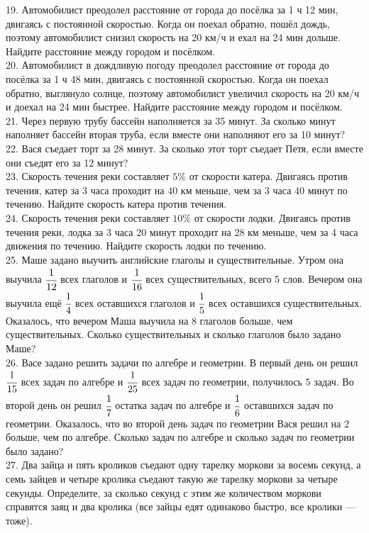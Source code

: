 \documentclass[12pt]{article}
\begin{document}
19. Автомобилист преодолел расстояние от города до посёлка за 1 ч 12 мин, двигаясь с постоянной скоростью. Когда он поехал обратно, пошёл дождь, поэтому автомобилист снизил скорость на 20 км/ч и ехал на 24 мин дольше. Найдите расстояние между городом и посёлком.\\
20. Автомобилист в дождливую погоду преодолел расстояние от города до посёлка за 1 ч 48 мин, двигаясь с постоянной скоростью. Когда он поехал обратно, выглянуло солнце, поэтому автомобилист увеличил скорость на 20 км/ч и доехал на 24 мин быстрее. Найдите расстояние между городом и посёлком.\\
21. Через первую трубу бассейн наполняется за 35 минут. За сколько минут наполняет бассейн вторая труба, если вместе они наполняют его за 10 минут?\\
22. Вася съедает торт за 28 минут. За сколько этот торт съедает Петя, если вместе они съедят его за 12 минут?\\
23. Скорость течения реки составляет $5\%$ от скорости катера. Двигаясь против течения, катер за 3 часа проходит на 40 км меньше, чем за 3 часа 40 минут по течению. Найдите скорость катера против течения.\\
24. Скорость течения реки составляет $10\%$ от скорости лодки. Двигаясь против течения реки, лодка за 3 часа 20 минут проходит на 28 км меньше, чем за 4 часа движения по течению. Найдите скорость лодки по течению.\\
25. Маше задано выучить английские глаголы и существительные. Утром она выучила $\cfrac{1}{12}$ всех глаголов и $\cfrac{1}{16}$ всех существительных, всего 5 слов. Вечером она выучила ещё $\cfrac{1}{4}$ всех оставшихся глаголов и $\cfrac{1}{5}$ всех оставшихся существительных. Оказалось, что вечером Маша выучила на 8 глаголов больше, чем существительных. Сколько существительных и сколько глаголов было задано Маше?\\
26. Васе задано решить задачи по алгебре и геометрии. В первый день он решил $\cfrac{1}{15}$ всех задач по алгебре и $\cfrac{1}{25}$ всех задач по геометрии, получилось 5 задач. Во второй день он решил $\cfrac{1}{7}$ остатка задач по алгебре и $\cfrac{1}{6}$ оставшихся задач по геометрии. Оказалось, что во второй день задач по геометрии Вася решил на 2 больше, чем по алгебре. Сколько задач по алгебре и сколько задач по геометрии было задано?\\
27. Два зайца и пять кроликов съедают одну тарелку моркови за восемь секунд, а семь зайцев и четыре кролика съедают такую же тарелку моркови за четыре секунды. Определите, за сколько секунд с этим же количеством моркови справятся заяц и два кролика (все зайцы едят одинаково быстро, все кролики --- тоже).\\
\end{document}
